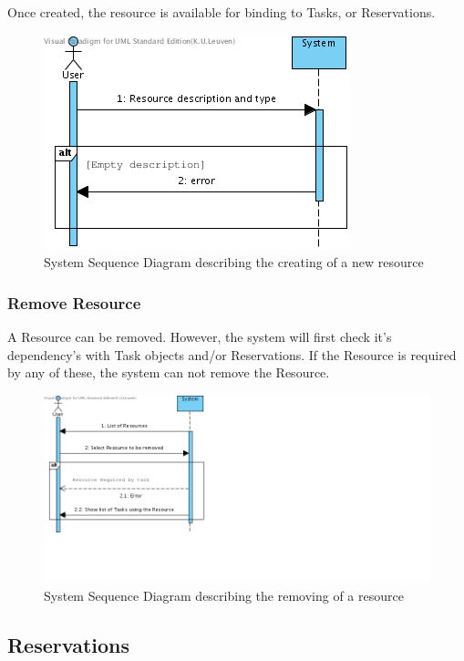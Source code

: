 			Once created, the resource is available for binding to Tasks, or Reservations.
			\begin{figure}[H]
				\begin{center}
					\includegraphics[scale=0.5]{images/SSD_Create_Resource.png}
				\end{center}
				\caption{System Sequence Diagram describing the creating of a new resource}
			\end{figure}
			\subsubsection{Remove Resource}
			A Resource can be removed. However, the system will first check it's dependency's with Task objects and/or Reservations.
			If the Resource is required by any of these, the system can not remove the Resource.
			\begin{figure}[H]
				\begin{center}
					\includegraphics[scale=0.5]{images/SSD_Remove_Resource.png}
				\end{center}
				\caption{System Sequence Diagram describing the removing of a resource}
			\end{figure}
		\subsection{Reservations}
